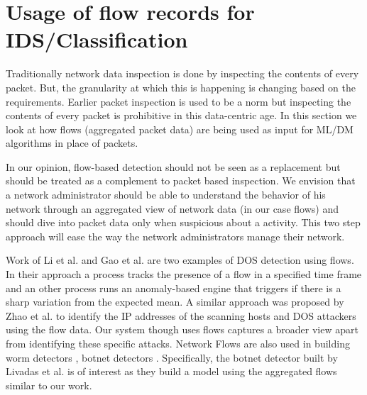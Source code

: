 \section{Usage of flow records for IDS/Classification}

Traditionally network data inspection is done by inspecting the contents of every packet. But, the granularity at which this is happening is changing based on the requirements. Earlier packet inspection is used to be a norm but inspecting the contents of every packet is prohibitive in this data-centric age. In this section we look at how flows (aggregated packet data) are being used as input for ML/DM algorithms in place of packets.

In our opinion, flow-based detection should not be seen as a replacement but should be treated as a complement to packet based inspection. We envision that a network administrator should be able to understand the behavior of his network through an aggregated view of network data (in our case flows) and should dive into packet data only when suspicious about a activity. This two step approach will ease the way the network administrators manage their network.

Work of Li et al. \cite{gao2005towards} and Gao et al. \cite{gao2006resilient} are two examples of DOS detection using flows. In their approach a process tracks the presence of a flow in a specified time frame and an other process runs an anomaly-based engine that triggers if there is a sharp variation from the expected mean. A similar approach was proposed by Zhao et al.\cite{zhao2006detection} to identify the IP addresses of the scanning hosts and DOS attackers using the flow data. Our system though uses flows captures a broader view apart from identifying these specific attacks. Network Flows are also used in building worm detectors \cite{dubendorfer2005framework} \cite{diibendorfer2005host}, botnet detectors \cite{strayer2008botnet} \cite{livadas2006usilng} \cite{karasaridis2007wide}. Specifically, the botnet detector built by Livadas et al.  \cite{livadas2006usilng} is of interest as they  build a model using the aggregated flows similar to our work.

